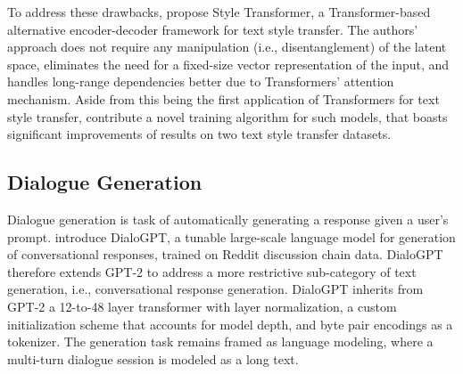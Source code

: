 
To address these drawbacks, \cite{dai2019style} propose Style Transformer, a Transformer-based alternative encoder-decoder framework for text style transfer. The authors' approach does not require any manipulation (i.e., disentanglement) of the latent space, eliminates the need for a fixed-size vector representation of the input, and handles long-range dependencies better due to Transformers' attention mechanism. Aside from this being the first application of Transformers for text style transfer, \cite{dai2019style} contribute a novel training algorithm for such models, that boasts significant improvements of results on two text style transfer datasets.

\subsection{Dialogue Generation}
Dialogue generation is task of automatically generating a response given a user's prompt. \cite{zhang2019dialogpt} introduce DialoGPT, a tunable large-scale language model for generation of conversational responses, trained on Reddit discussion chain data. DialoGPT therefore extends GPT-2 \citep{radford2019language} to address a more restrictive sub-category of text generation, i.e., conversational response generation. DialoGPT inherits from GPT-2 a 12-to-48 layer transformer with layer normalization, a custom initialization scheme that accounts for model depth, and byte pair encodings \citep{sennrich-etal-2016-neural} as a tokenizer. The generation task remains framed as language modeling, where a multi-turn dialogue session is modeled as a long text. 

